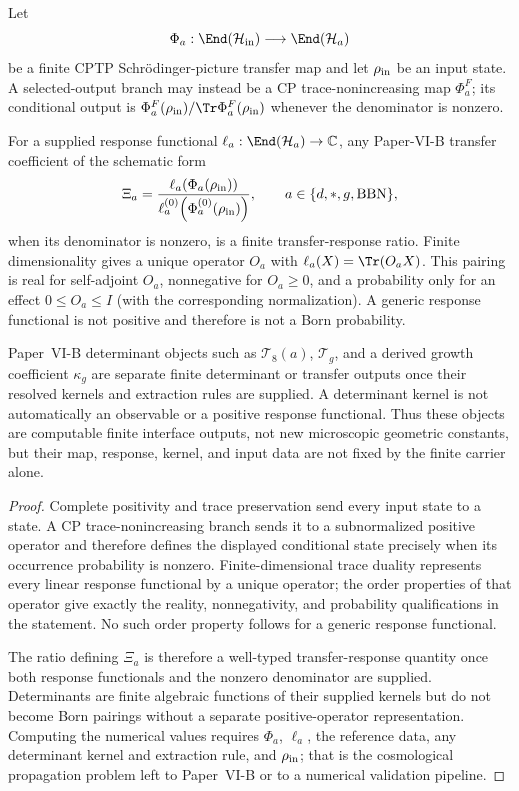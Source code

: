 \documentclass[12pt,a4paper]{article}
\begin{document}
\begin{theorem}
\label{p4:thm:finite-transfer-kernel-status}
Let
\[
\Phi_a:\End(\mathcal H_{\rm in})\longrightarrow\End(\mathcal H_a)
\]
be a finite CPTP Schr\"odinger-picture transfer map and let
\(\rho_{\rm in}\) be an input state.  A selected-output branch may instead
be a CP trace-nonincreasing map \(\Phi_a^F\); its conditional output is
\(\Phi_a^F(\rho_{\rm in})/\Tr\Phi_a^F(\rho_{\rm in})\) whenever the
denominator is nonzero.

For a supplied response functional
\(\ell_a:\End(\mathcal H_a)\to\mathbb C\), any Paper-VI-B transfer coefficient
of the schematic form
\[
\Xi_a
=
\frac{\ell_a\!\left(\Phi_a(\rho_{\rm in})\right)}
{\ell_a^{(0)}\!\left(\Phi_a^{(0)}(\rho_{\rm in})\right)},
\qquad
a\in\{d,*,g,\mathrm{BBN}\},
\]
when its denominator is nonzero, is a finite transfer-response ratio.
Finite dimensionality gives a unique operator \(O_a\) with
\(\ell_a(X)=\Tr(O_aX)\).  This pairing is real for self-adjoint \(O_a\),
nonnegative for \(O_a\ge0\), and a probability only for an effect
\(0\le O_a\le I\) (with the corresponding normalization).  A generic
response functional is not positive and therefore is not a Born
probability.

Paper~VI-B determinant objects such as \(\mathcal T_8(a)\),
\(\mathcal T_g\), and a derived growth coefficient \(\kappa_g\) are
separate finite determinant or transfer outputs once their resolved
kernels and extraction rules are supplied.  A determinant kernel is not
automatically an observable or a positive response functional.  Thus these
objects are computable finite interface outputs, not new microscopic
geometric constants, but their map, response, kernel, and input data are not
fixed by the finite carrier alone.
\end{theorem}


\begin{proof}
Complete positivity and trace preservation send every input state to a
state.  A CP trace-nonincreasing branch sends it to a subnormalized positive
operator and therefore defines the displayed conditional state precisely
when its occurrence probability is nonzero.  Finite-dimensional trace
duality represents every linear response functional by a unique operator;
the order properties of that operator give exactly the reality,
nonnegativity, and probability qualifications in the statement.  No such
order property follows for a generic response functional.

The ratio defining \(\Xi_a\) is therefore a well-typed transfer-response
quantity once both response functionals and the nonzero denominator are
supplied.  Determinants are finite algebraic functions of their supplied
kernels but do not become Born pairings without a separate positive-operator
representation.  Computing the numerical values requires
\(\Phi_a\), \(\ell_a\), the reference data, any determinant kernel and
extraction rule, and \(\rho_{\rm in}\); that is the cosmological propagation
problem left to Paper~VI-B or to a numerical validation pipeline.
\end{proof}
\end{document}
